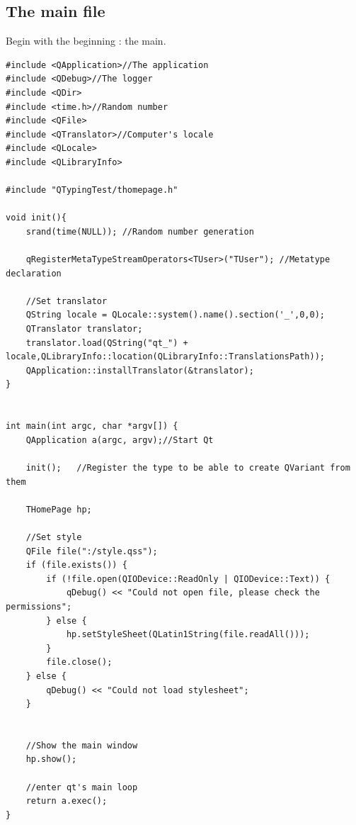 \subsection{The main file}
Begin with the beginning : the main.
\begin{lstlisting}
#include <QApplication>//The application
#include <QDebug>//The logger
#include <QDir>
#include <time.h>//Random number 
#include <QFile>
#include <QTranslator>//Computer's locale
#include <QLocale>
#include <QLibraryInfo>

#include "QTypingTest/thomepage.h"

void init(){
    srand(time(NULL)); //Random number generation

    qRegisterMetaTypeStreamOperators<TUser>("TUser"); //Metatype declaration

    //Set translator
    QString locale = QLocale::system().name().section('_',0,0);
    QTranslator translator;
    translator.load(QString("qt_") + locale,QLibraryInfo::location(QLibraryInfo::TranslationsPath));
    QApplication::installTranslator(&translator);
}


int main(int argc, char *argv[]) {
    QApplication a(argc, argv);//Start Qt

    init();   //Register the type to be able to create QVariant from them

    THomePage hp;

    //Set style
    QFile file(":/style.qss");
    if (file.exists()) {
        if (!file.open(QIODevice::ReadOnly | QIODevice::Text)) {
            qDebug() << "Could not open file, please check the permissions";
        } else {
            hp.setStyleSheet(QLatin1String(file.readAll()));
        }
        file.close();
    } else {
        qDebug() << "Could not load stylesheet";
    }


	//Show the main window
    hp.show();

	//enter qt's main loop
    return a.exec();
}
\end{lstlisting}

